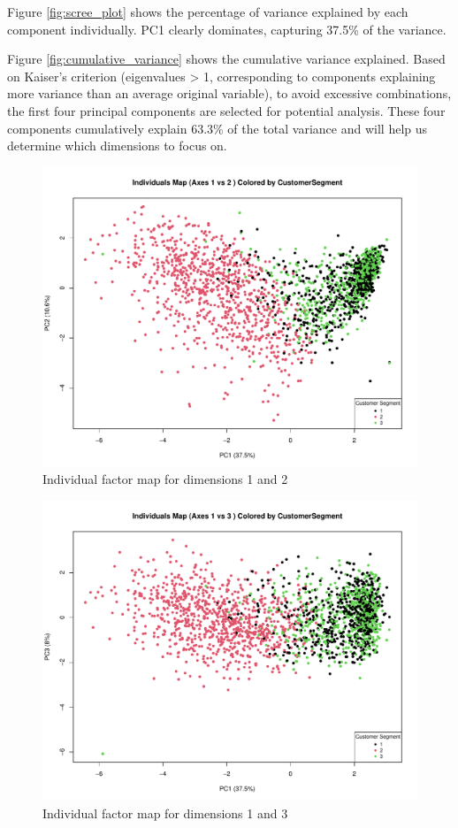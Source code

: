 Figure \ref{fig:scree_plot} shows the percentage of variance explained by each component individually. PC1 clearly dominates, capturing 37.5\% of the variance.

Figure \ref{fig:cumulative_variance} shows the cumulative variance explained. Based on Kaiser's criterion (eigenvalues > 1, corresponding to components explaining more variance than an average original variable), to avoid excessive combinations, the first four principal components are selected for potential analysis. These four components cumulatively explain 63.3\% of the total variance and will help us determine which dimensions to focus on.



\begin{figure}[H]
    \centering
    \includegraphics[width=0.8\linewidth]{Imatges/individuals_map_1_2.pdf}
    \caption{Individual factor map for dimensions 1 and 2}
    \label{fig:individuals_map_1_2}
\end{figure}

\begin{figure}[H]
    \centering
    \includegraphics[width=0.8\linewidth]{Imatges/individuals_map_1_3.pdf}
    \caption{Individual factor map for dimensions 1 and 3}
    \label{fig:individuals_map_1_3}
\end{figure}

